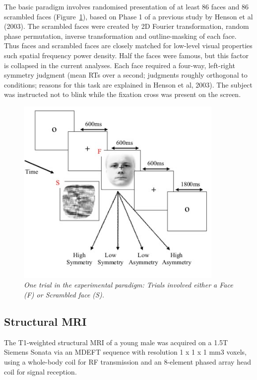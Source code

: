 The basic paradigm involves randomised presentation of at least 86 faces and 86 scrambled faces (Figure~\ref{fig_32_1}), based on Phase 1 of a previous study by Henson et al (2003). The scrambled faces were created by 2D Fourier transformation, random phase permutation, inverse transformation and outline-masking of each face. Thus faces and scrambled faces are closely matched for low-level visual properties such spatial frequency power density. Half the faces were famous, but this factor is collapsed in the current analyses. Each face required a four-way, left-right symmetry judgment (mean RTs over a second; judgments roughly orthogonal to conditions; reasons for this task are explained in Henson et al, 2003). The subject was instructed not to blink while the fixation cross was present on the screen.


\begin{figure}
\begin{center}
\includegraphics[width=100mm]{multimodal/figures/figure_32_1}
\caption{\em One trial in the experimental paradigm: Trials involved either a Face (F) or Scrambled face (S). \label{fig_32_1}}
\end{center}
\end{figure}

\subsection{Structural MRI}

The T1-weighted structural MRI of a young male was acquired on a 1.5T Siemens Sonata via an MDEFT sequence with resolution 1 x 1 x 1 mm3 voxels, using a whole-body coil for RF transmission and an 8-element phased array head coil for signal reception.

